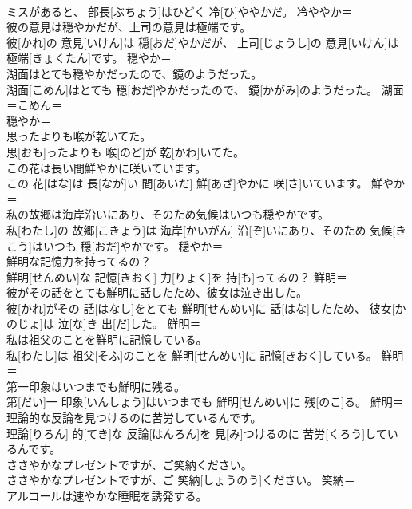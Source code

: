 \documentclass[8pt]{extreport}
\begin{document}
\begin{CJK}{UTF8}{min}
\\	ミスがあると、 部長[ぶちょう]はひどく 冷[ひ]ややかだ。	冷ややか＝ 
\\	彼の意見は穏やかだが、上司の意見は極端です。	
\\	彼[かれ]の 意見[いけん]は 穏[おだ]やかだが、 上司[じょうし]の 意見[いけん]は 極端[きょくたん]です。	穏やか＝ 
\\	湖面はとても穏やかだったので、鏡のようだった。	
\\	湖面[こめん]はとても 穏[おだ]やかだったので、 鏡[かがみ]のようだった。	湖面＝こめん＝ 
\\	穏やか＝ 
\\	思ったよりも喉が乾いてた。	
\\	思[おも]ったよりも 喉[のど]が 乾[かわ]いてた。	
\\	この花は長い間鮮やかに咲いています。	
\\	この 花[はな]は 長[なが]い 間[あいだ] 鮮[あざ]やかに 咲[さ]いています。	鮮やか＝ 
\\	私の故郷は海岸沿いにあり、そのため気候はいつも穏やかです。	
\\	私[わたし]の 故郷[こきょう]は 海岸[かいがん] 沿[ぞ]いにあり、そのため 気候[きこう]はいつも 穏[おだ]やかです。	穏やか＝ 
\\	鮮明な記憶力を持ってるの？	
\\	鮮明[せんめい]な 記憶[きおく] 力[りょく]を 持[も]ってるの？	鮮明＝ 
\\	彼がその話をとても鮮明に話したため、彼女は泣き出した。	
\\	彼[かれ]がその 話[はなし]をとても 鮮明[せんめい]に 話[はな]したため、 彼女[かのじょ]は 泣[な]き 出[だ]した。	鮮明＝ 
\\	私は祖父のことを鮮明に記憶している。	
\\	私[わたし]は 祖父[そふ]のことを 鮮明[せんめい]に 記憶[きおく]している。	鮮明＝ 
\\	第一印象はいつまでも鮮明に残る。	
\\	第[だい]一 印象[いんしょう]はいつまでも 鮮明[せんめい]に 残[のこ]る。	鮮明＝ 
\\	理論的な反論を見つけるのに苦労しているんです。	
\\	理論[りろん] 的[てき]な 反論[はんろん]を 見[み]つけるのに 苦労[くろう]しているんです。	
\\	ささやかなプレゼントですが、ご笑納ください。	
\\	ささやかなプレゼントですが、ご 笑納[しょうのう]ください。	笑納＝ 
\\	アルコールは速やかな睡眠を誘発する。	

\end{CJK}
\end{document}
